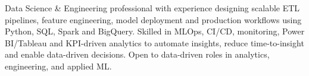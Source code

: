 \begin{justify}
Data Science \& Engineering professional with experience designing scalable ETL pipelines, feature engineering, model deployment and production workflows using Python, SQL, Spark and BigQuery. 
Skilled in MLOps, CI/CD, monitoring, Power BI/Tableau and KPI-driven analytics to automate insights, reduce time-to-insight and enable data-driven decisions. Open to data-driven roles in analytics, engineering, and applied ML.
\end{justify}
\vspace{-15pt}